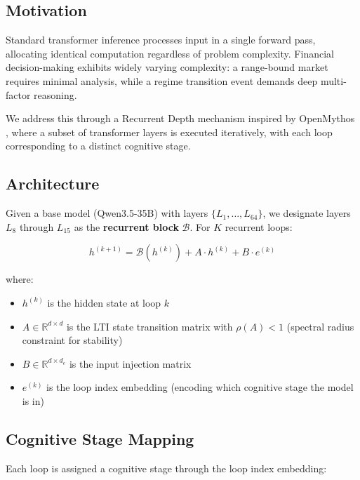 \documentclass[11pt, a4paper]{article}
\begin{document}
\subsection{Motivation}

Standard transformer inference processes input in a single forward pass, allocating identical computation regardless of problem complexity. Financial decision-making exhibits widely varying complexity: a range-bound market requires minimal analysis, while a regime transition event demands deep multi-factor reasoning.

We address this through a Recurrent Depth mechanism inspired by OpenMythos \cite{openmythos}, where a subset of transformer layers is executed iteratively, with each loop corresponding to a distinct cognitive stage.

\subsection{Architecture}

Given a base model (Qwen3.5-35B) with layers $\{L_1, \ldots, L_{64}\}$, we designate layers $L_8$ through $L_{15}$ as the \textbf{recurrent block} $\mathcal{B}$. For $K$ recurrent loops:

\begin{equation}
  h^{(k+1)} = \mathcal{B}(h^{(k)}) + A \cdot h^{(k)} + B \cdot e^{(k)}
\end{equation}

where:
\begin{itemize}
  \item $h^{(k)}$ is the hidden state at loop $k$
  \item $A \in \mathbb{R}^{d \times d}$ is the LTI state transition matrix with $\rho(A) < 1$ (spectral radius constraint for stability)
  \item $B \in \mathbb{R}^{d \times d_e}$ is the input injection matrix
  \item $e^{(k)}$ is the loop index embedding (encoding which cognitive stage the model is in)
\end{itemize}

\subsection{Cognitive Stage Mapping}

Each loop is assigned a cognitive stage through the loop index embedding:
\end{document}
